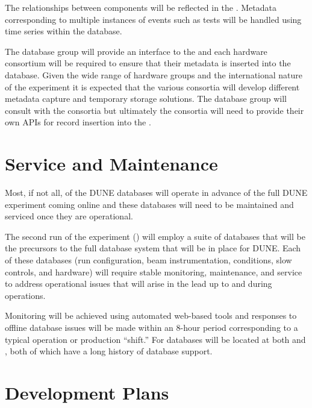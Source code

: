 \documentclass[../main-v1.tex]{subfiles}
\begin{document}
The relationships between components will be reflected in the . Metadata corresponding to multiple instances of events such as  tests will be handled using time series within the database. 

The database group will provide an interface to the  and each hardware consortium will be required to ensure that their metadata is inserted into the database. Given the wide range of hardware groups and the international nature of the experiment it is expected that the various consortia will develop different metadata capture and temporary storage solutions. The database group will consult with the consortia but ultimately the consortia will need to provide their own APIs for record insertion into the .  


\section{Service and Maintenance  }
\label{sec:db:service}  

Most, if not all, of the DUNE databases will operate in advance of the full DUNE experiment coming online and these databases will need to be maintained and serviced once they are operational. 

The second run of the  experiment () will employ a suite of databases that will be the precursors to the full database system that will be in place for DUNE. Each of these databases (run configuration, beam instrumentation, conditions, slow controls, and hardware) will require stable monitoring, maintenance, and service to address operational issues that will arise in the lead up to and during %
 operations.

Monitoring will be achieved using automated web-based tools  and responses to offline database issues will be made within an 8-hour period corresponding to a typical operation or production ``shift.'' For  databases will be located at both  and , both of which have a long history of database support.

\section{Development Plans  }
\end{document}
